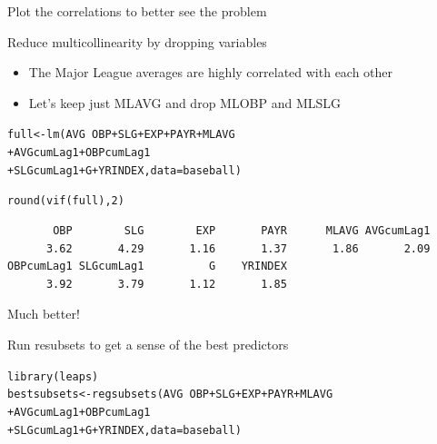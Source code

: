 \documentclass{beamer}\usepackage[]{graphicx}\usepackage[]{color}
\makeatletter
\newcommand{\hlnum}[1]{\textcolor[rgb]{0.824,0.412,0.118}{#1}}%
\newcommand{\hlopt}[1]{\textcolor[rgb]{1,0.894,0.769}{#1}}%
\newcommand{\hlstd}[1]{\textcolor[rgb]{1,0.894,0.769}{#1}}%
\newcommand{\hlkwb}[1]{\textcolor[rgb]{0.804,0.776,0.451}{#1}}%
\newcommand{\hlkwc}[1]{\textcolor[rgb]{0.78,0.941,0.545}{#1}}%
\newcommand{\hlkwd}[1]{\textcolor[rgb]{1,0.78,0.769}{#1}}%
\newenvironment{kframe}{%
 \def\at@end@of@kframe{}%
 \ifinner\ifhmode%
  \def\at@end@of@kframe{\end{minipage}}%
  \begin{minipage}{\columnwidth}%
 \fi\fi%
 \def\FrameCommand##1{\hskip\@totalleftmargin \hskip-\fboxsep
 \colorbox{shadecolor}{##1}\hskip-\fboxsep
     \hskip-\linewidth \hskip-\@totalleftmargin \hskip\columnwidth}%
 \MakeFramed {\advance\hsize-\width
   \@totalleftmargin\z@ \linewidth\hsize
   \@setminipage}}%
 {\par\unskip\endMakeFramed%
 \at@end@of@kframe}
\newenvironment{knitrout}{}{} %
\makeatother
\begin{document}
\begin{darkframes}
\begin{frame}[fragile]{Plot the correlations to better see the problem}
\begin{knitrout}
\end{knitrout}
    \end{frame}

    \begin{frame}[fragile]{Reduce multicollinearity by dropping variables}
      \fontsize{8}{8}\selectfont 
      \begin{itemize}
        \item The Major League averages are highly correlated with each other
        \item Let's keep just MLAVG and drop MLOBP and MLSLG
        \end{itemize} 

\begin{knitrout}
\begin{kframe}
\begin{alltt}
\hlstd{full} \hlkwb{<-} \hlkwd{lm}\hlstd{(AVG} \hlopt{~} \hlstd{OBP} \hlopt{+} \hlstd{SLG} \hlopt{+} \hlstd{EXP} \hlopt{+} \hlstd{PAYR} \hlopt{+} \hlstd{MLAVG}
\hlopt{+} \hlstd{AVGcumLag1} \hlopt{+} \hlstd{OBPcumLag1}
\hlopt{+} \hlstd{SLGcumLag1} \hlopt{+} \hlstd{G} \hlopt{+} \hlstd{YRINDEX,} \hlkwc{data}\hlstd{=baseball)}

\hlkwd{round}\hlstd{(}\hlkwd{vif}\hlstd{(full),} \hlnum{2}\hlstd{)}
\end{alltt}
\begin{verbatim}
       OBP        SLG        EXP       PAYR      MLAVG AVGcumLag1 
      3.62       4.29       1.16       1.37       1.86       2.09 
OBPcumLag1 SLGcumLag1          G    YRINDEX 
      3.92       3.79       1.12       1.85 
\end{verbatim}
\end{kframe}
\end{knitrout}

      {Much better!}
    \end{frame}


    \begin{frame}[fragile]{Run resubsets to get a sense of the best predictors}
    \fontsize{8}{8}\selectfont  
\begin{knitrout}
\begin{kframe}
\begin{alltt}
\hlkwd{library}\hlstd{(leaps)}
\hlstd{bestsubsets} \hlkwb{<-} \hlkwd{regsubsets}\hlstd{(AVG} \hlopt{~} \hlstd{OBP} \hlopt{+} \hlstd{SLG} \hlopt{+} \hlstd{EXP} \hlopt{+} \hlstd{PAYR} \hlopt{+} \hlstd{MLAVG}
\hlopt{+} \hlstd{AVGcumLag1} \hlopt{+} \hlstd{OBPcumLag1}
\hlopt{+} \hlstd{SLGcumLag1} \hlopt{+} \hlstd{G} \hlopt{+} \hlstd{YRINDEX,} \hlkwc{data}\hlstd{=baseball)}
\end{alltt}
\end{kframe}
\end{knitrout}


\end{frame}
\end{darkframes}
\end{document}
